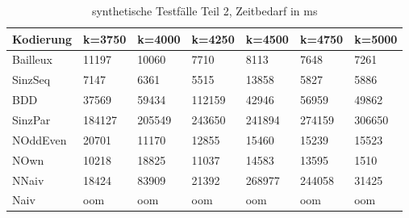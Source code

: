 \documentclass[a4,abstract=on]{scrartcl}
\begin{document}
\begin{landscape}
\begin{table}[h!]
    \small
    \setlength{\tabcolsep}{0.11cm}
     \centering
     \begin{tabular}[width=\textwidth]{|l||l|l|l|l|l|l|}
	\hline
       \textbf{Kodierung} &\textbf{k=3750} &\textbf{k=4000} &\textbf{k=4250} &\textbf{k=4500} &\textbf{k=4750} &\textbf{k=5000}\\
\hline	
\hline
 Bailleux & 11197 & 10060 & 7710 & 8113 & 7648 & 7261\\
\hline
SinzSeq & 7147 & 6361 & 5515 & 13858 & 5827 & 5886\\
\hline
BDD & 37569 & 59434 & 112159 & 42946 & 56959 & 49862\\
\hline
SinzPar & 184127 & 205549 & 243650 & 241894 & 274159 &306650\\
\hline
NOddEven & 20701 & 11170 & 12855 & 15460 & 15239 & 15523\\
\hline
NOwn  & 10218 & 18825 & 11037 & 14583 & 13595 & 1510\\
\hline
NNaiv & 18424 & 83909 & 21392 & 268977 & 244058 & 31425\\
\hline
Naiv  & oom & oom & oom & oom & oom & oom\\
\hline

 \end{tabular}

     \caption{synthetische Testfälle Teil 2, Zeitbedarf in ms}
     \label{tbl:beispieltabelle}

   \end{table}



\end{landscape}
\end{document}
